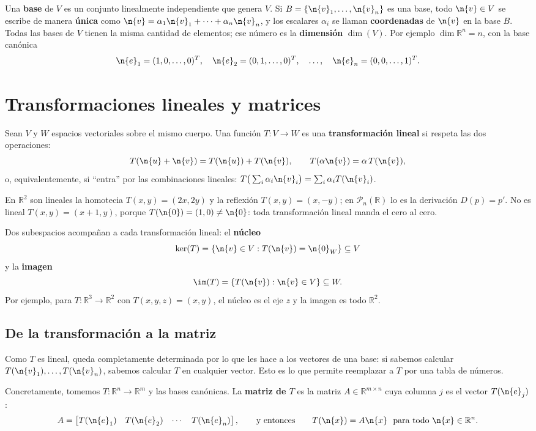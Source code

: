 Una \textbf{base} de $V$ es un conjunto linealmente independiente que genera
$V$. Si $B = \{\n{v}_1, \dots, \n{v}_n\}$ es una base, todo $\n{v} \in V$ se
escribe de manera \textbf{única} como $\n{v} = \alpha_1 \n{v}_1 + \cdots +
\alpha_n \n{v}_n$, y los escalares $\alpha_i$ se llaman \textbf{coordenadas} de
$\n{v}$ en la base $B$. Todas las bases de $V$ tienen la misma cantidad de
elementos; ese número es la \textbf{dimensión} $\dim(V)$. Por ejemplo
$\dim \mathbb{R}^n = n$, con la base canónica
\[
\n{e}_1 = (1,0,\dots,0)^T, \quad
\n{e}_2 = (0,1,\dots,0)^T, \quad \dots, \quad
\n{e}_n = (0,0,\dots,1)^T .
\]

\section{Transformaciones lineales y matrices}

Sean $V$ y $W$ espacios vectoriales sobre el mismo cuerpo. Una función
$T: V \to W$ es una \textbf{transformación lineal} si respeta las dos
operaciones:
\[
T(\n{u} + \n{v}) = T(\n{u}) + T(\n{v}),
\qquad
T(\alpha \n{v}) = \alpha\, T(\n{v}),
\]
o, equivalentemente, si ``entra'' por las combinaciones lineales:
$T\big(\sum_i \alpha_i \n{v}_i\big) = \sum_i \alpha_i T(\n{v}_i)$.

En $\mathbb{R}^2$ son lineales la homotecia $T(x,y) = (2x, 2y)$ y la reflexión
$T(x,y) = (x, -y)$; en $\mathcal{P}_n(\mathbb{R})$ lo es la derivación
$D(p) = p'$. No es lineal $T(x,y) = (x+1, y)$, porque $T(\n{0}) = (1,0) \neq
\n{0}$: toda transformación lineal manda el cero al cero.

Dos subespacios acompañan a cada transformación lineal: el \textbf{núcleo}
\[
\ker(T) = \{\n{v} \in V : T(\n{v}) = \n{0}_W\} \subseteq V
\]
y la \textbf{imagen}
\[
\im(T) = \{T(\n{v}) : \n{v} \in V\} \subseteq W .
\]
Por ejemplo, para $T:\mathbb{R}^3 \to \mathbb{R}^2$ con $T(x,y,z) = (x,y)$, el
núcleo es el eje $z$ y la imagen es todo $\mathbb{R}^2$.

\subsection{De la transformación a la matriz}

Como $T$ es lineal, queda completamente determinada por lo que les hace a los
vectores de una base: si sabemos calcular $T(\n{v}_1),\dots,T(\n{v}_n)$, sabemos
calcular $T$ en cualquier vector. Esto es lo que permite reemplazar a $T$ por una
tabla de números.

Concretamente, tomemos $T:\mathbb{R}^n\to\mathbb{R}^m$ y las bases canónicas.
La \textbf{matriz de $T$} es la matriz $A\in\mathbb{R}^{m\times n}$ cuya columna
$j$ es el vector $T(\n{e}_j)$:
\[
A = \begin{bmatrix} T(\n{e}_1) & T(\n{e}_2) & \cdots & T(\n{e}_n)\end{bmatrix},
\qquad\text{y entonces}\qquad
T(\n{x}) = A\n{x} \ \text{ para todo } \n{x}\in\mathbb{R}^n .
\]

